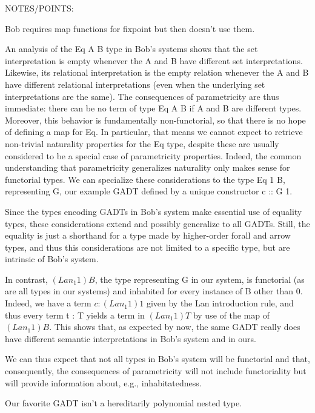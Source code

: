 \documentclass[acmsmall,screen,review,anonymous]{acmart}
\theoremstyle{definition}
\begin{document}
NOTES/POINTS:

Bob requires map functions for fixpoint but then doesn't use them.

An analysis of the Eq A B type in Bob's systems shows that the set
interpretation is empty whenever the A and B have different set
interpretations.  Likewise, its relational interpretation is the empty
relation whenever the A and B have different relational
interpretations (even when the underlying set interpretations are the
same).  The consequences of parametricity are thus immediate: there
can be no term of type Eq A B if A and B are different types.
Moreover, this behavior is fundamentally non-functorial, so that there
is no hope of defining a map for Eq.  In particular, that means we
cannot expect to retrieve non-trivial naturality properties for the Eq
type, despite these are usually considered to be a special case of
parametricity properties.  Indeed, the common understanding that
parametricity generalizes naturality only makes sense for functorial
types.  We can specialize these considerations to the type Eq 1 B,
representing G, our example GADT defined by a unique constructor c ::
G 1.

Since the types encoding GADTs in Bob's system make essential use
of equality types, these considerations extend and possibly generalize
to all GADTs.  Still, the equality is just a shorthand for a type made
by higher-order forall and arrow types, and thus this considerations
are not limited to a specific type, but are intrinsic of Bob's
system.

In contrast, $(Lan_1 1) B$, the type representing G in our system, is
functorial (as are all types in our systems) and inhabited for every
instance of B other than 0.  Indeed, we have a term $c : (Lan_1 1) 1$
given by the Lan introduction rule, and thus every term t : T yields a
term in $(Lan_1 1) T$ by use of the map of $(Lan_1 1) B$.  This shows
that, as expected by now, the same GADT really does have different
semantic interpretations in Bob's system and in ours.


We can thus expect that not all types in Bob's system will
be functorial and that, consequently, the consequences of
parametricity will not include functoriality but will provide
information about, e.g., inhabitatedness.


 
{\color{blue} Our favorite GADT isn't a hereditarily
  polynomial nested type.}
\end{document}
